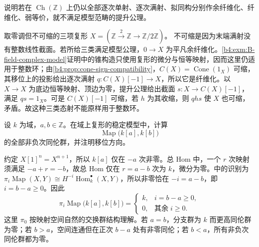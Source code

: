 \begin{exercise}\label{b4:ex:B-model-nonfield}
	说明若在 \(\operatorname{Ch}(\mathbb Z)\) 上仍以全部逐次单射、逐次满射、拟同构分别作余纤维化、纤维化、弱等价，就不满足模型范畴的提升公理。
\end{exercise}
\begin{solution}
	取零调但不可缩的三项复形 \(X=(\mathbb Z\xrightarrow{2}\mathbb Z\rightarrow\mathbb Z/2\mathbb Z)\)。 不可缩是因为末端满射没有整数线性截面。若所给三类满足模型公理，\(0\rightarrow X\) 为平凡余纤维化。\cref{b4:exm:B-field-complex-model}证明中的锥构造只使用复形的微分与恒等映射，因而这里仍适用于整数环；由\cref{b4:prop:cone-sign-compatibility}，\(C(X)=\operatorname{Cone}(1_X)\) 可缩，其移位上的投影给出逐次满射 \(q:C(X)[-1]\rightarrow X\)，所以它是纤维化。以 \(X\rightarrow X\) 为底边恒等映射、顶边为零，提升公理给出截面 \(s:X\rightarrow C(X)[-1]\)，满足 \(qs=1_X\)。可是 \(C(X)[-1]\) 可缩，若 \(h\) 为其收缩，则 \(qhs\) 使 \(X\) 也可缩，矛盾。故这种三类态射不能原样用于整数环。
\end{solution}

\begin{exercise}\label{b4:ex:B-shifted-mapping}
	设 \(k\) 为域，\(a,b\in\mathbb Z\)。在域上复形的稳定模型中，计算
	\[
		\operatorname{Map}\bigl(k[a],k[b]\bigr)
	\]
	的全部非负次同伦群，并注明移位方向。
\end{exercise}
\begin{solution}
	约定 \(X[1]^n=X^{n+1}\)，所以 \(k[a]\) 仅在 \(-a\) 次非零。总 Hom 中，一个 \(r\) 次映射须满足 \(-a+r=-b\)，故总 Hom 仅在 \(r=a-b\) 次为 \(k\)，微分为零。中的识别为 \(\pi_i\operatorname{Map}(X,Y)\cong H^{-i}\operatorname{Hom}_k^\bullet(X,Y)\)，所以非零恰在 \(-i=a-b\)，即 \(i=b-a\ge0\)。因此
	\[
		\pi_i\operatorname{Map}\bigl(k[a],k[b]\bigr)
		=\begin{cases}k,&i=b-a\ge0,\\0,&\text{其余}\;i\ge0.\end{cases}
	\]
	这里 \(\pi_0\) 按映射空间自然的交换群结构理解。若 \(a=b\)，分支群为 \(k\) 而更高同伦群为零；若 \(b>a\)，空间连通但在正次 \(b-a\) 处有非零同伦；若 \(b<a\)，所有非负次同伦群都为零。
\end{solution}

